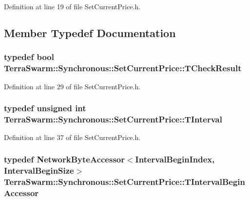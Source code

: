 Definition at line 19 of file Set\-Current\-Price.\-h.



\subsection{Member Typedef Documentation}
\hypertarget{class_terra_swarm_1_1_synchronous_1_1_set_current_price_aeed4ef4c867719626ede15e2f8718436}{
\subsubsection[{T\-Check\-Result}]{\setlength{\rightskip}{0pt plus 5cm}typedef bool {\bf Terra\-Swarm\-::\-Synchronous\-::\-Set\-Current\-Price\-::\-T\-Check\-Result}}}\label{class_terra_swarm_1_1_synchronous_1_1_set_current_price_aeed4ef4c867719626ede15e2f8718436}


Definition at line 29 of file Set\-Current\-Price.\-h.

\hypertarget{class_terra_swarm_1_1_synchronous_1_1_set_current_price_aa87902078a0788d13ef70b899d83f4d3}{
\subsubsection[{T\-Interval}]{\setlength{\rightskip}{0pt plus 5cm}typedef unsigned int {\bf Terra\-Swarm\-::\-Synchronous\-::\-Set\-Current\-Price\-::\-T\-Interval}}}\label{class_terra_swarm_1_1_synchronous_1_1_set_current_price_aa87902078a0788d13ef70b899d83f4d3}


Definition at line 37 of file Set\-Current\-Price.\-h.

\hypertarget{class_terra_swarm_1_1_synchronous_1_1_set_current_price_a2d095e9cd5341bca06b121f115875bcc}{
\subsubsection[{T\-Interval\-Begin\-Accessor}]{\setlength{\rightskip}{0pt plus 5cm}typedef {\bf Network\-Byte\-Accessor}$<${\bf Interval\-Begin\-Index}, {\bf Interval\-Begin\-Size}$>$ {\bf Terra\-Swarm\-::\-Synchronous\-::\-Set\-Current\-Price\-::\-T\-Interval\-Begin\-Accessor}\hspace{0.3cm}{\ttfamily [private]}}}\label{class_terra_swarm_1_1_synchronous_1_1_set_current_price_a2d095e9cd5341bca06b121f115875bcc}


